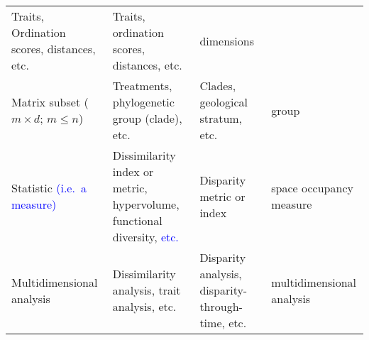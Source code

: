 \documentclass[]{article}
\begin{document}
\begin{longtable}[]{@{}llll@{}}
\begin{minipage}[t]{0.24\columnwidth}
Traits, Ordination scores, distances, etc.\strut
\end{minipage} & \begin{minipage}[t]{0.24\columnwidth}\raggedright\strut
Traits, ordination scores, distances, etc.\strut
\end{minipage} & \begin{minipage}[t]{0.15\columnwidth}\raggedright\strut
dimensions\strut
\end{minipage}\tabularnewline
\begin{minipage}[t]{0.24\columnwidth}\raggedright\strut
Matrix subset (\(m \times d\); \(m \leq n\))\strut
\end{minipage} & \begin{minipage}[t]{0.24\columnwidth}\raggedright\strut
Treatments, phylogenetic group (clade), etc.\strut
\end{minipage} & \begin{minipage}[t]{0.24\columnwidth}\raggedright\strut
Clades, geological stratum, etc.\strut
\end{minipage} & \begin{minipage}[t]{0.15\columnwidth}\raggedright\strut
group\strut
\end{minipage}\tabularnewline
\begin{minipage}[t]{0.24\columnwidth}\raggedright\strut
Statistic \textcolor{blue}{ (i.e.~a measure) }\strut
\end{minipage} & \begin{minipage}[t]{0.24\columnwidth}\raggedright\strut
Dissimilarity index or metric, hypervolume, functional diversity,
\textcolor{blue}{ etc. }\strut
\end{minipage} & \begin{minipage}[t]{0.24\columnwidth}\raggedright\strut
Disparity metric or index\strut
\end{minipage} & \begin{minipage}[t]{0.15\columnwidth}\raggedright\strut
space occupancy measure\strut
\end{minipage}\tabularnewline
\begin{minipage}[t]{0.24\columnwidth}\raggedright\strut
Multidimensional analysis\strut
\end{minipage} & \begin{minipage}[t]{0.24\columnwidth}\raggedright\strut
Dissimilarity analysis, trait analysis, etc.\strut
\end{minipage} & \begin{minipage}[t]{0.24\columnwidth}\raggedright\strut
Disparity analysis, disparity-through-time, etc.\strut
\end{minipage} & \begin{minipage}[t]{0.15\columnwidth}\raggedright\strut
multidimensional analysis\strut
\end{minipage}\tabularnewline
\bottomrule
\end{longtable}
\end{document}
